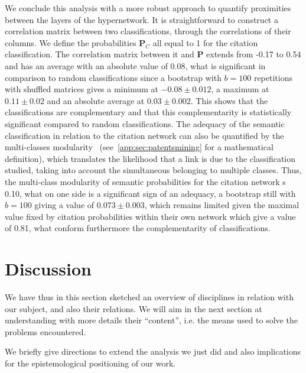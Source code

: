 \documentclass[galley]{jtlu-article-2col}
\begin{document}
We conclude this analysis with a more robust approach to quantify proximities between the layers of the hypernetwork. It is straightforward to construct a correlation matrix between two classifications, through the correlations of their columns. We define the probabilities $\mathbf{P}_C$ all equal to 1 for the citation classification. The correlation matrix between it and $\mathbf{P}$ extends from -0.17 to 0.54 and has an average with an absolute value of 0.08, what is significant in comparison to random classifications since a bootstrap with $b=100$ repetitions with shuffled matrices gives a minimum at $-0.08 \pm 0.012$, a maximum at $0.11 \pm 0.02$ and an absolute average at $0.03 \pm 0.002$. This shows that the classifications are complementary and that this complementarity is statistically significant compared to random classifications. The adequacy of the semantic classification in relation to the citation network can also be quantified by the multi-classes modularity~\cite{nicosia2009extending} (see~\ref{app:sec:patentsmining} for a mathematical definition), which translates the likelihood that a link is due to the classification studied, taking into account the simultaneous belonging to multiple classes. Thus, the multi-class modularity of semantic probabilities for the citation network s 0.10, what on one side is a significant sign of an adequacy, a bootstrap still with $b=100$ giving a value of $0.073 \pm 0.003$, which remains limited given the maximal value fixed by citation probabilities within their own network which give a value of 0.81, what conform furthermore the complementarity of classifications.







\section{Discussion}


We have thus in this section sketched an overview of disciplines in relation with our subject, and also their relations. We will aim in the next section at understanding with more details their ``content'', i.e. the means used to solve the problems encountered.

We briefly give directions to extend the analysis we just did and also implications for the epistemological positioning of our work.
\end{document}
